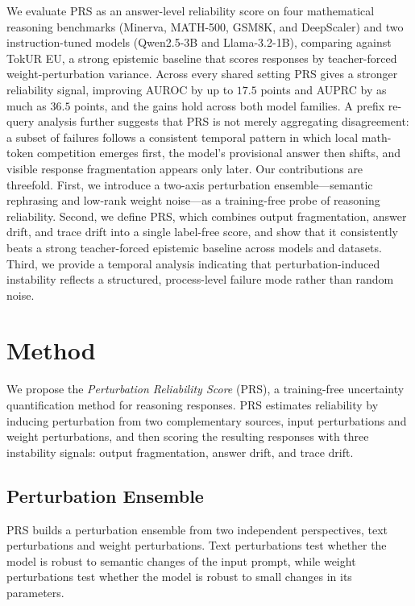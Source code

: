 \documentclass{article} %
\begin{document}
We evaluate PRS as an answer-level reliability score on four mathematical
reasoning benchmarks (Minerva, MATH-500, GSM8K, and DeepScaler) and two
instruction-tuned models (Qwen2.5-3B and Llama-3.2-1B), comparing against TokUR
EU, a strong epistemic baseline that scores responses by teacher-forced
weight-perturbation variance. Across every shared setting PRS gives a stronger
reliability signal, improving AUROC by up to $17.5$ points and AUPRC by as much
as $36.5$ points, and the gains hold across both model families. A prefix
re-query analysis further suggests that PRS is not merely aggregating disagreement:
a subset of failures follows a consistent temporal pattern in which local
math-token competition emerges first, the model's provisional answer then shifts,
and visible response fragmentation appears only later. Our contributions are
threefold. First, we introduce a two-axis perturbation ensemble---semantic
rephrasing and low-rank weight noise---as a training-free probe of reasoning
reliability. Second, we define PRS, which combines output fragmentation, answer
drift, and trace drift into a single label-free score, and show that it
consistently beats a strong teacher-forced epistemic baseline across models and
datasets. Third, we provide a temporal analysis indicating that
perturbation-induced instability reflects a structured, process-level failure
mode rather than random noise.


\section{Method}
\label{sec:method}

We propose the \emph{Perturbation Reliability Score} (PRS), a training-free
uncertainty quantification method for reasoning responses. PRS estimates
reliability by inducing perturbation from two complementary sources, input
perturbations and weight perturbations, and then scoring the resulting responses
with three instability signals: output fragmentation, answer drift, and trace
drift.


\subsection{Perturbation Ensemble}
\label{sec:perturbation-ensemble}

PRS builds a perturbation ensemble from two independent perspectives, text
perturbations and weight perturbations. Text perturbations test whether the
model is robust to semantic changes of the input prompt, while weight
perturbations test whether the model is robust to small changes in its
parameters.
\end{document}
